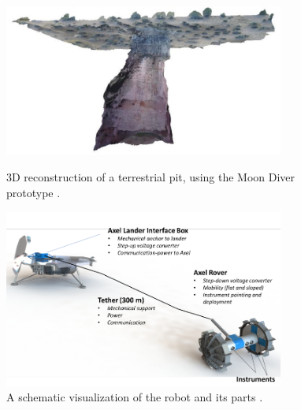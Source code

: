 \begin{figure}[H]
    \centering
    \begin{minipage}[b]{0.49\textwidth}
        \centering
        \includegraphics[width=0.82\textwidth]{moon-diver-pit-recon.png}
        \caption{3D reconstruction of a terrestrial pit, using the Moon Diver prototype \cite{kerber2023}.}
    \end{minipage}
    \begin{minipage}[b]{0.49\textwidth}
        \centering
        \includegraphics[width=0.82\textwidth]{moon-diver-schemoid.png}
        \caption{A schematic visualization of the robot and its parts \cite{nesnas2019}.}
    \end{minipage}
\end{figure}
